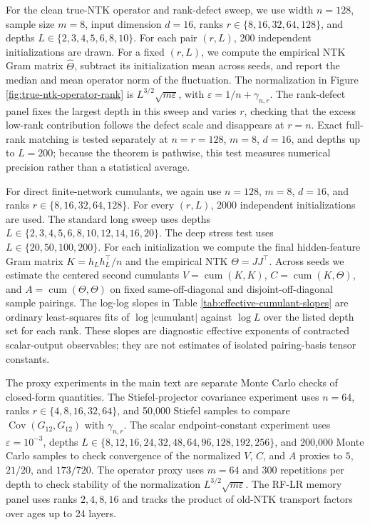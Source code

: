 \documentclass{article}
\newcommand{\Cov}{\operatorname{Cov}}
\newcommand{\cumul}{\operatorname{cum}}
\begin{document}
For the clean true-NTK operator and rank-defect sweep, we use width \(n=128\), sample size \(m=8\), input dimension \(d=16\), ranks \(r\in\{8,16,32,64,128\}\), and depths \(L\in\{2,3,4,5,6,8,10\}\). For each pair \((r,L)\), 200 independent initializations are drawn. For a fixed \((r,L)\), we compute the empirical NTK Gram matrix \(\widehat\Theta\), subtract its initialization mean across seeds, and report the median and mean operator norm of the fluctuation. The normalization in Figure \ref{fig:true-ntk-operator-rank} is \(L^{3/2}\sqrt{m\varepsilon}\), with \(\varepsilon=1/n+\gamma_{n,r}\). The rank-defect panel fixes the largest depth in this sweep and varies \(r\), checking that the excess low-rank contribution follows the defect scale and disappears at \(r=n\). Exact full-rank matching is tested separately at \(n=r=128\), \(m=8\), \(d=16\), and depths up to \(L=200\); because the theorem is pathwise, this test measures numerical precision rather than a statistical average.

For direct finite-network cumulants, we again use \(n=128\), \(m=8\), \(d=16\), and ranks \(r\in\{8,16,32,64,128\}\). For every \((r,L)\), 2000 independent initializations are used. The standard long sweep uses depths \(L\in\{2,3,4,5,6,8,10,12,14,16,20\}\). The deep stress test uses \(L\in\{20,50,100,200\}\). For each initialization we compute the final hidden-feature Gram matrix \(K=h_Lh_L^\top/n\) and the empirical NTK \(\Theta=JJ^\top\). Across seeds we estimate the centered second cumulants \(V=\cumul(K,K)\), \(C=\cumul(K,\Theta)\), and \(A=\cumul(\Theta,\Theta)\) on fixed same-off-diagonal and disjoint-off-diagonal sample pairings. The log-log slopes in Table \ref{tab:effective-cumulant-slopes} are ordinary least-squares fits of \(\log|\text{cumulant}|\) against \(\log L\) over the listed depth set for each rank. These slopes are diagnostic effective exponents of contracted scalar-output observables; they are not estimates of isolated pairing-basis tensor constants.

The proxy experiments in the main text are separate Monte Carlo checks of closed-form quantities. The Stiefel-projector covariance experiment uses \(n=64\), ranks \(r\in\{4,8,16,32,64\}\), and 50,000 Stiefel samples to compare \(\Cov(G_{12},G_{12})\) with \(\gamma_{n,r}\). The scalar endpoint-constant experiment uses \(\varepsilon=10^{-3}\), depths \(L\in\{8,12,16,24,32,48,64,96,128,192,256\}\), and 200,000 Monte Carlo samples to check convergence of the normalized \(V\), \(C\), and \(A\) proxies to \(5\), \(21/20\), and \(173/720\). The operator proxy uses \(m=64\) and 300 repetitions per depth to check stability of the normalization \(L^{3/2}\sqrt{m\varepsilon}\). The RF-LR memory panel uses ranks \(2,4,8,16\) and tracks the product of old-NTK transport factors over ages up to 24 layers.
\end{document}

